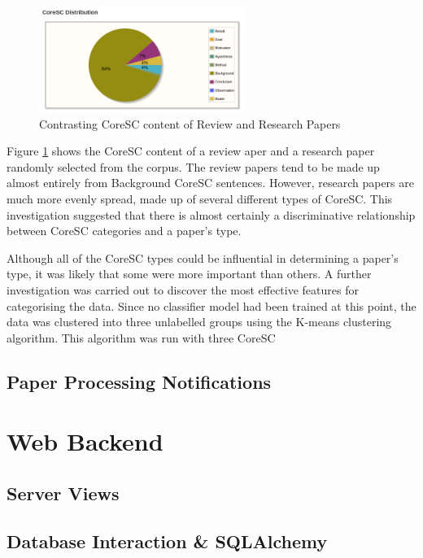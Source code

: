 \begin{figure}[!h]
\centering
\includegraphics[width=0.6\textwidth]{images/implementation/review_corescs.png}
\caption{Contrasting CoreSC content of Review and Research Papers}
\label{fig:coresc_pies}
\end{figure}

Figure \ref{fig:coresc_pies} shows the CoreSC content of a review aper and a
research paper randomly selected from the corpus. The review papers tend to be
made up almost entirely from Background CoreSC sentences. However, research
papers are much more evenly spread, made up of several different types of
CoreSC. This investigation suggested that there is almost certainly a discriminative
relationship between CoreSC categories and a paper's type. 

Although all of the CoreSC types could be influential in determining a paper's
type, it was likely that some were more important than others. A further
investigation was carried out to discover the most effective features for
categorising the data. Since no classifier model had been trained at this
point, the data was clustered into three unlabelled groups using the K-means
clustering algorithm. This algorithm was run with three CoreSC 



\subsection{ Paper Processing Notifications }




\section{ Web Backend }

\subsection{ Server Views }

\subsection{Database Interaction \& SQLAlchemy}

